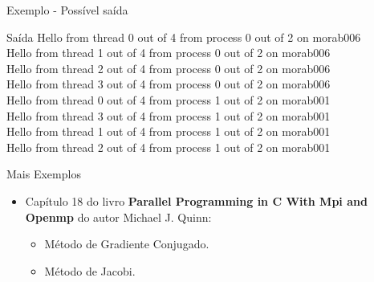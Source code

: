 \begin{frame}{Exemplo - Possível saída}
	\begin{alertblock}{Saída}
		Hello from thread 0 out of 4 from process 0 out of 2 on morab006\\
		Hello from thread 1 out of 4 from process 0 out of 2 on morab006\\
		Hello from thread 2 out of 4 from process 0 out of 2 on morab006\\
		Hello from thread 3 out of 4 from process 0 out of 2 on morab006\\
		Hello from thread 0 out of 4 from process 1 out of 2 on morab001\\
		Hello from thread 3 out of 4 from process 1 out of 2 on morab001\\
		Hello from thread 1 out of 4 from process 1 out of 2 on morab001\\
		Hello from thread 2 out of 4 from process 1 out of 2 on morab001
	\end{alertblock}
\end{frame}

\begin{frame}[fragile]{Mais Exemplos}
	\begin{itemize}
		\item Capítulo 18 do livro \textbf{Parallel Programming in C With Mpi and Openmp} do autor Michael J. Quinn:
		\medskip
		\begin{itemize}
			\item Método de Gradiente Conjugado.
			\medskip
			\item Método de Jacobi.
		\end{itemize}
	\end{itemize}
\end{frame}

